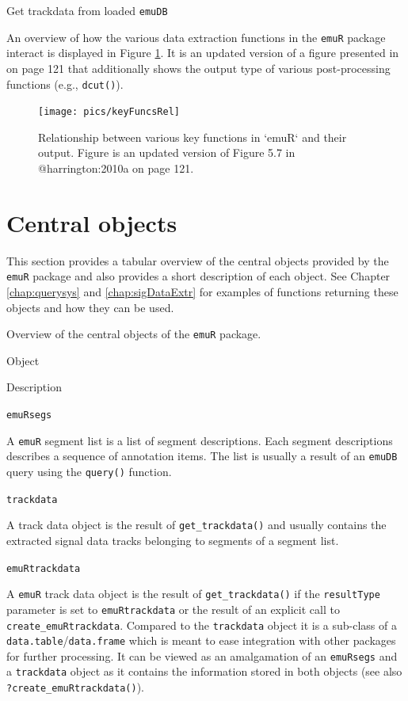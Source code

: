 \documentclass[]{book}
\begin{document}
Get trackdata from loaded \texttt{emuDB}

An overview of how the various data extraction functions in the \texttt{emuR} package interact is displayed in Figure \ref{fig:emuRpackageDetails-dataExtrRel}. It is an updated version of a figure presented in \citet{harrington:2010a} on page 121 that additionally shows the output type of various post-processing functions (e.g., \texttt{dcut()}).

\begin{figure}

{\centering \texttt{[image: pics/keyFuncsRel]} 

}

\caption{Relationship between various key functions in `emuR` and their output. Figure is an updated version of Figure 5.7 in @harrington:2010a on page 121.}\label{fig:emuRpackageDetails-dataExtrRel}
\end{figure}

\hypertarget{sec:emuRpackageDetails-centralObjects}{%
\section{Central objects}\label{sec:emuRpackageDetails-centralObjects}}

This section provides a tabular overview of the central objects provided by the \texttt{emuR} package and also provides a short description of each object. See Chapter \ref{chap:querysys} and \ref{chap:sigDataExtr} for examples of functions returning these objects and how they can be used.

\label{tab:emuRpackageDetails-centralObjects}Overview of the central objects of the \texttt{emuR} package.

Object

Description

\texttt{emuRsegs}

A \texttt{emuR} segment list is a list of segment descriptions. Each segment descriptions describes a sequence of annotation items. The list is usually a result of an \texttt{emuDB} query using the \texttt{query()} function.

\texttt{trackdata}

A track data object is the result of \texttt{get\_trackdata()} and usually contains the extracted signal data tracks belonging to segments of a segment list.

\texttt{emuRtrackdata}

A \texttt{emuR} track data object is the result of \texttt{get\_trackdata()} if the \texttt{resultType} parameter is set to \texttt{emuRtrackdata} or the result of an explicit call to \texttt{create\_emuRtrackdata}. Compared to the \texttt{trackdata} object it is a sub-class of a \texttt{data.table}/\texttt{data.frame} which is meant to ease integration with other packages for further processing. It can be viewed as an amalgamation of an \texttt{emuRsegs} and a \texttt{trackdata} object as it contains the information stored in both objects (see also \texttt{?create\_emuRtrackdata()}).
\end{document}
